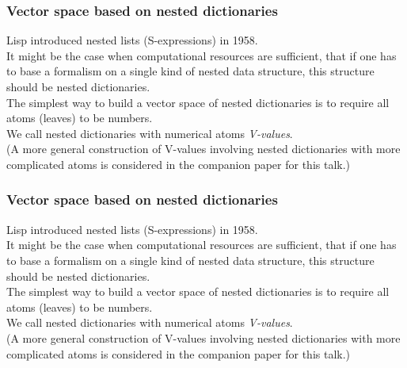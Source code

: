 \documentclass{beamer}
\newcommand{\msgray}[1]{{\color{mygray} #1}}
\begin{document}
\begin{frame}

  \frametitle{Vector space based on nested dictionaries}

Lisp introduced nested lists (S-expressions) in 1958.\\[2ex]

\msgray{It might be the case when computational resources are sufficient, 
that if one has to base a formalism on a single kind of nested data structure, this structure should be nested dictionaries.\\[2ex]

The simplest way to build a vector space of nested dictionaries is to require
all atoms (leaves) to be numbers.\\[2ex]

We call nested dictionaries with numerical atoms {\em V-values}.\\[2ex]

(A more general construction of V-values involving nested dictionaries with more complicated atoms is considered in the companion paper for this talk.)}

\end{frame}

\begin{frame}

  \frametitle{Vector space based on nested dictionaries}

Lisp introduced nested lists (S-expressions) in 1958.\\[2ex]

It might be the case when computational resources are sufficient, 
that if one has to base a formalism on a single kind of nested data structure, this structure should be nested dictionaries.\\[2ex]

\msgray{The simplest way to build a vector space of nested dictionaries is to require
all atoms (leaves) to be numbers.\\[2ex]

We call nested dictionaries with numerical atoms {\em V-values}.\\[2ex]

(A more general construction of V-values involving nested dictionaries with more complicated atoms is considered in the companion paper for this talk.)}

\end{frame}
\end{document}
